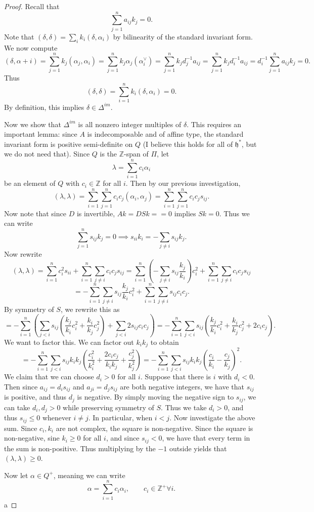 \documentclass[11pt, letterpaper]{article}
\theoremstyle{plain}
\begin{document}
\begin{proof}
	Recall that
	\[
		\sum_{j=1}^{n} a_{ij} k_j=0
	.\]
	Note that $(\delta ,\delta ) = \sum_{i}k_i(\delta ,\alpha _i)$ by bilinearity of the standard invariant form. We now compute
	\[
		(\delta ,\alpha +i) = \sum_{j=1}^{n}k_j(\alpha _j,\alpha _i) = \sum_{j=1}^{n} k_j \alpha _j(\alpha _i^\vee )=\sum_{j=1}^{n} k_j d_j^{-1}a_{ij} = \sum_{j=1}^{n} k_jd_i^{-1} a_{ij} = d_i ^{-1} \sum_{j=1}^{n} a_{ij} k_j = 0
	.\]
	Thus
	\[
		(\delta ,\delta )= \sum_{i=1}^{n} k_i(\delta ,\alpha _i) = 0
	.\]
	By definition, this implies $\delta \in\Delta ^{im} $.

	Now we show that $\Delta ^{im } $ is all nonzero integer multiples of $\delta $. This requires an important lemma: since $A$ is indecomposable and of affine type, the standard invariant form is positive semi-definite on $Q$ (I believe this holds for all of $\mathfrak{h} ^*$, but we do not need that). Since $Q$ is the $\mathbb{Z} $-span of $\Pi $, let
	\[
		\lambda  = \sum_{i=1}^{n} c_i\alpha _i
	\]
	be an element of $Q$ with $c_i\in\mathbb{Z} $ for all $i$. Then by our previous investigation,
	\[
		(\lambda ,\lambda ) = \sum_{i=1}^{n} \sum_{j=1}^{n} c_ic_j(\alpha _i,\alpha _j)=\sum_{i=1}^{n} \sum_{j=1}^{n} c_ic_js_{ij} 
	.\]
	Now note that since $D$ is invertible, $Ak = DSk = =0$ implies $Sk=0$. Thus we can write
	\[
		\sum_{j=1}^{n} s_{ij} k_j = 0 \implies s_{ii} k_i = -\sum_{j\neq i} s_{ij} k_j
	.\]
	Now rewrite
	\[
		(\lambda ,\lambda ) = \sum_{i=1}^{n} c_i^2s_{ii} + \sum_{i=1}^{n} \sum_{j\neq i} c_ic_js_{ij} = \sum_{i=1}^{n} \left( -\sum_{j\neq i} s_{ij} \frac{k_j}{k_i}  \right) c_i^2 + \sum_{i=1}^{n} \sum_{j\neq i} c_ic_js_{ij} 
	\]
	\[
		=-\sum_{i=1}^{n} \sum_{j\neq i} s_{ij} \frac{k_j}{k_i} c_i^2 + \sum_{i=1}^{n} \sum_{j\neq i} s_{ij} c_ic_j
	.\]
	By symmetry of $S$, we rewrite this as
	\[
		= - \sum_{i=1}^{n} \left(\sum_{j<i} s_{ij} \left( \frac{k_j}{k_i} c_i^2 + \frac{k_i}{k_j} c_j^2 \right) +\sum_{j<i} 2s_{ij} c_ic_j \right)=-\sum_{i=1}^{n} \sum_{j<i} s_{ij} \left( \frac{k_j}{k_i} c_i^2 + \frac{k_i}{k_j} c_j^2 + 2c_ic_j \right) 
	.\]
	We want to factor this. We can factor out $k_ik_j$ to obtain
	\[
		=- \sum_{i=1}^{n} \sum_{j<i} s_{ij} k_ik_j\left( \frac{c_i^2}{k_i^2} +\frac{2c_ic_j}{k_ik_j} + \frac{c_j^2}{k_j^2}  \right) =-\sum_{i=1}^{n} \sum_{j<i} s_{ij} k_ik_j\left( \frac{c_i}{k_i} -\frac{c_j}{k_j}  \right) ^2
	.\]
	We claim that we can choose $d_i>0$ for all $i$. Suppose that there is $i$ with $d_i < 0$. Then since $a_{ij} =d_is_{ij} $ and $a_{ji} =d_js_{ij} $ are both negative integers, we have that $s_{ij} $ is positive, and thus $d_j$ is negative. By simply moving the negative sign to $s_{ij} $, we can take $d_i,d_j>0$ while preserving symmetry of $S$. Thus we take $d_i>0$, and thus $s_{ij} \leq 0$ whenever $i\neq j$. In particular, when $i<j$. Now investigate the above sum. Since $c_i,k_i$ are not complex, the square is non-negative. Since the square is non-negative, sine $k_i \geq  0$ for all $i$, and since $s_{ij} <0$, we have that every term in the sum is non-positive. Thus multiplying by the $-1$ outside yields that $(\lambda ,\lambda )\geq 0$.

	Now let $\alpha \in Q^+$, meaning we can write
	\[
		\alpha =\sum_{i=1}^{n} c_i\alpha _i,\qquad c_i\in\mathbb{Z} ^+\forall i
	.\]
	a
\end{proof}
\end{document}
